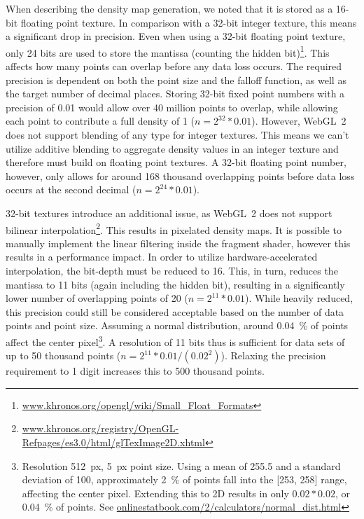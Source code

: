 \documentclass[sigconf]{acmart}
\begin{document}
When describing the density map generation, we noted that it is stored as a 16-bit floating point texture.
In comparison with a 32-bit integer texture, this means a significant drop in precision.
Even when using a 32-bit floating point texture, only 24 bits are used to store the mantissa (counting the hidden bit)\footnote{\href{https://www.khronos.org/opengl/wiki/Small_Float_Formats}{www.khronos.org/opengl/wiki/Small\_Float\_Formats}}.
This affects how many points can overlap before any data loss occurs.
The required precision is dependent on both the point size and the falloff function, as well as the target number of decimal places.
Storing 32-bit fixed point numbers with a precision of 0.01 would allow over 40 million points to overlap, while allowing each point to contribute a full density of 1 ($n = 2^{32}*0.01$).
However, WebGL~2 does not support blending of any type for integer textures.
This means we can't utilize additive blending to aggregate density values in an integer texture and therefore must build on floating point textures.
A 32-bit floating point number, however, only allows for around 168 thousand overlapping points before data loss occurs at the second decimal ($n = 2^{24}*0.01$).

32-bit textures introduce an additional issue, as WebGL~2 does not support bilinear interpolation\footnote{\href{https://www.khronos.org/registry/OpenGL-Refpages/es3.0/html/glTexImage2D.xhtml}{www.khronos.org/registry/OpenGL-Refpages/es3.0/html/glTexImage2D.xhtml}}.
This results in pixelated density maps.
It is possible to manually implement the linear filtering inside the fragment shader, however this results in a performance impact.
In order to utilize hardware-accelerated interpolation, the bit-depth must be reduced to 16.
This, in turn, reduces the mantissa to 11 bits (again including the hidden bit), resulting in a significantly lower number of overlapping points of 20 ($n = 2^{11}*0.01$).
While heavily reduced, this precision could still be considered acceptable based on the number of data points and point size.
Assuming a normal distribution,
around 0.04~\% of points affect the center pixel\footnote{
  Resolution 512~px, 5~px point size.
  Using a mean of 255.5 and a standard deviation of 100, approximately 2~\% of points fall into the [253, 258] range, affecting the center pixel.
  Extending this to 2D results in only $0.02*0.02$, or 0.04~\% of points.
  See \href{https://onlinestatbook.com/2/calculators/normal_dist.html}{onlinestatbook.com/2/calculators/normal\_dist.html}
}.
A resolution of 11 bits thus is sufficient for data sets of up to 50 thousand points ($n = 2^{11}*0.01/(0.02^2)$).
Relaxing the precision requirement to 1 digit increases this to 500 thousand points.
\end{document}

